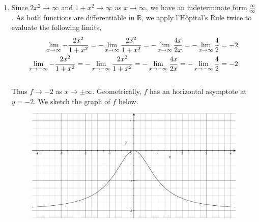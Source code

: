 \documentclass[12pt]{amsart}
\begin{document}
\begin{enumerate}
\begin{enumerate}
			\item Since $2x^2 \rightarrow \infty$ and $1+x^2 \rightarrow \infty$ as $x \rightarrow \infty$, we 			have an indeterminate form $\frac{\infty}{\infty}$. As both functions are differentiable in 
			$\mathbb{R}$, we apply l'H\^{o}pital's Rule twice to evaluate the following limits,
				\begin{align}
					\lim_{x\rightarrow \infty} -\frac{2x^2}{1+x^2}=-\lim_{x\rightarrow \infty} 
					\frac{2x^2}{1+x^2}=-\lim_{x\rightarrow \infty} \frac{4x}{2x}= 
					-\lim_{x\rightarrow \infty} \frac{4}{2} = -2 \notag \\
					\lim_{x\rightarrow -\infty} -\frac{2x^2}{1+x^2}=-\lim_{x\rightarrow-\infty}
					\frac{2x^2}{1+x^2}=-\lim_{x\rightarrow-\infty} \frac{4x}{2x} =  										-\lim_{x\rightarrow -\infty} \frac{4}{2} = -2 \notag
				\end{align}
			\\
			Thus $f\rightarrow-2$ as $x \rightarrow\pm\infty$.  Geometrically, $f$ has an horizontal 
			asymptote at $y=-2$. We sketch the graph of $f$ below.
				\begin{figure}[h]
					\centering
					\includegraphics[width=5in]{2f.pdf}
				\end{figure} \\
		\end{enumerate}
								

\end{enumerate}
\end{document}
